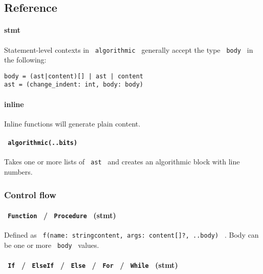 \subsection{Reference}\label{reference}

\paragraph{stmt}\label{stmt}

Statement-level contexts in \texttt{\ algorithmic\ } generally accept
the type \texttt{\ body\ } in the following:

\begin{verbatim}
body = (ast|content)[] | ast | content
ast = (change_indent: int, body: body)
\end{verbatim}

\paragraph{inline}\label{inline}

Inline functions will generate plain content.

\paragraph{\texorpdfstring{\texttt{\ algorithmic(..bits)\ }}{ algorithmic(..bits) }}\label{algorithmic..bits}

Takes one or more lists of \texttt{\ ast\ } and creates an algorithmic
block with line numbers.

\subsubsection{Control flow}\label{control-flow}

\paragraph{\texorpdfstring{\texttt{\ Function\ } /
\texttt{\ Procedure\ }
(stmt)}{ Function  /  Procedure  (stmt)}}\label{function-procedure-stmt}

Defined as
\texttt{\ f(name:\ string\textbar{}content,\ args:\ content{[}{]}?,\ ..body)\ }
. Body can be one or more \texttt{\ body\ } values.

\paragraph{\texorpdfstring{\texttt{\ If\ } / \texttt{\ ElseIf\ } /
\texttt{\ Else\ } / \texttt{\ For\ } / \texttt{\ While\ }
(stmt)}{ If  /  ElseIf  /  Else  /  For  /  While  (stmt)}}\label{if-elseif-else-for-while-stmt}

